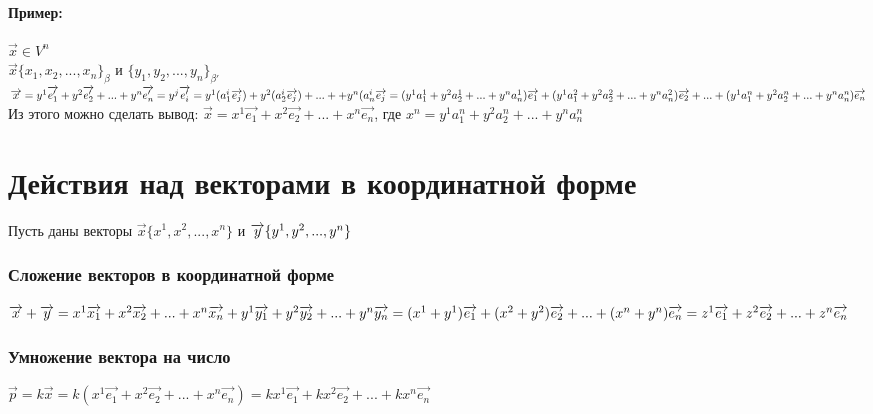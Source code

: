 \documentclass{article}
\begin{document}
\paragraph*{Пример:}
$\overrightarrow{x} \in V^n$\\
$\overrightarrow{x}\{x_1,x_2,...,x_n\}_\beta$ и $\{y_1,y_2,...,y_n\}_{\beta'}$\\
$\overrightarrow{x}=y^1\overrightarrow{e_1'}+y^2\overrightarrow{e_2'}+...+y^n\overrightarrow{e_n'}=y^j\overrightarrow{e_i'}=y^1(a^i_1\overrightarrow{e_j})+y^2(a^i_2\overrightarrow{e_j})+...++y^n(a^i_n\overrightarrow{e_j}=(y^1a_1^1+y^2a_2^1+...+y^{n}a^1_n)\overrightarrow{e_1}+(y^1a_1^2+y^2a_2^2+...+y^{n}a^2_n)\overrightarrow{e_2}+...+(y^1a_1^n+y^2a_2^n+...+y^{n}a^n_n)\overrightarrow{e_n}\\$
Из этого можно сделать вывод:
$\overrightarrow{x}=x^1\overrightarrow{e_1}+x^2\overrightarrow{e_2}+...+x^n\overrightarrow{e_n}$, где $x^n=y^1a_1^n+y^2a_2^n+...+y^{n}a^n_n$

\newpage
\section{Действия над векторами в координатной форме}
Пусть даны векторы $\overrightarrow{x}\{x^1,x^2,...,x^n\}$ и $\overrightarrow{y}\{y^1,y^2,...,y^n\}\\$
\subsubsection{Сложение векторов в координатной форме}
$\overrightarrow{x}+\overrightarrow{y}=x^1\overrightarrow{x_1}+x^2\overrightarrow{x_2}+...+x^n\overrightarrow{x_n}+y^1\overrightarrow{y_1}+y^2\overrightarrow{y_2}+...+y^n\overrightarrow{y_n}=(x^1+y^1)\overrightarrow{e_1}+(x^2+y^2)\overrightarrow{e_2}+...+(x^n+y^n)\overrightarrow{e_n}=z^1\overrightarrow{e_1}+z^2\overrightarrow{e_2}+...+z^n\overrightarrow{e_n}\\$
\subsubsection{Умножение вектора на число}
$\overrightarrow{p}=k\overrightarrow{x}=k(x^1\overrightarrow{e_1}+x^2\overrightarrow{e_2}+...+x^n\overrightarrow{e_n})=kx^1\overrightarrow{e_1}+kx^2\overrightarrow{e_2}+...+kx^n\overrightarrow{e_n}$
\end{document}
